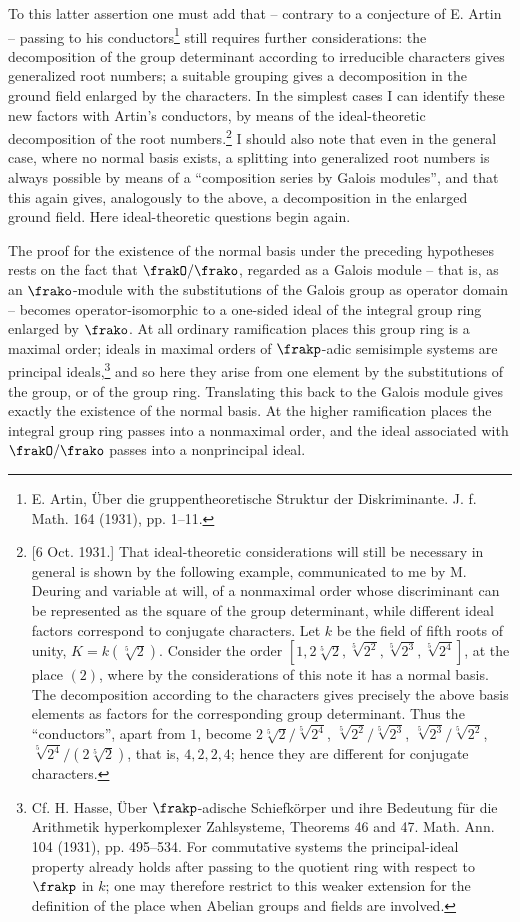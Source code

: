 To this latter assertion one must add that -- contrary to a conjecture of E. Artin -- passing to his conductors\footnote{E. Artin, Über die gruppentheoretische Struktur der Diskriminante. J. f. Math. 164 (1931), pp. 1--11.} still requires further considerations: the decomposition of the group determinant according to irreducible characters gives generalized root numbers; a suitable grouping gives a decomposition in the ground field enlarged by the characters. In the simplest cases I can identify these new factors with Artin's conductors, by means of the ideal-theoretic decomposition of the root numbers.\footnote{[6 Oct. 1931.] That ideal-theoretic considerations will still be necessary in general is shown by the following example, communicated to me by M. Deuring and variable at will, of a nonmaximal order whose discriminant can be represented as the square of the group determinant, while different ideal factors correspond to conjugate characters. Let \(k\) be the field of fifth roots of unity, \(K=k(\sqrt[5]{2})\). Consider the order \([1,2\sqrt[5]{2},\sqrt[5]{2^2},\sqrt[5]{2^3},\sqrt[5]{2^4}]\), at the place \((2)\), where by the considerations of this note it has a normal basis. The decomposition according to the characters gives precisely the above basis elements as factors for the corresponding group determinant. Thus the ``conductors'', apart from \(1\), become \(2\sqrt[5]{2}/\sqrt[5]{2^4}\), \(\sqrt[5]{2^2}/\sqrt[5]{2^3}\), \(\sqrt[5]{2^3}/\sqrt[5]{2^2}\), \(\sqrt[5]{2^4}/(2\sqrt[5]{2})\), that is, \(4,2,2,4\); hence they are different for conjugate characters.} I should also note that even in the general case, where no normal basis exists, a splitting into generalized root numbers is always possible by means of a ``composition series by Galois modules'', and that this again gives, analogously to the above, a decomposition in the enlarged ground field. Here ideal-theoretic questions begin again.

The proof for the existence of the normal basis under the preceding hypotheses rests on the fact that \(\frakO/\frako\), regarded as a Galois module -- that is, as an \(\frako\)-module with the substitutions of the Galois group as operator domain -- becomes operator-isomorphic to a one-sided ideal of the integral group ring enlarged by \(\frako\). At all ordinary ramification places this group ring is a maximal order; ideals in maximal orders of \(\frakp\)-adic semisimple systems are principal ideals,\footnote{Cf. H. Hasse, Über \(\frakp\)-adische Schiefkörper und ihre Bedeutung für die Arithmetik hyperkomplexer Zahlsysteme, Theorems 46 and 47. Math. Ann. 104 (1931), pp. 495--534. For commutative systems the principal-ideal property already holds after passing to the quotient ring with respect to \(\frakp\) in \(k\); one may therefore restrict to this weaker extension for the definition of the place when Abelian groups and fields are involved.} and so here they arise from one element by the substitutions of the group, or of the group ring. Translating this back to the Galois module gives exactly the existence of the normal basis. At the higher ramification places the integral group ring passes into a nonmaximal order, and the ideal associated with \(\frakO/\frako\) passes into a nonprincipal ideal.


